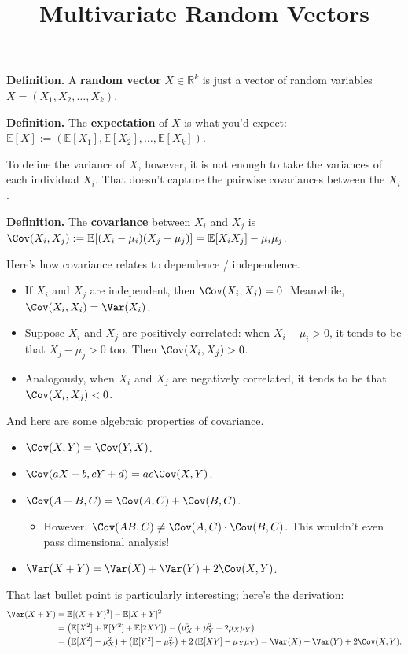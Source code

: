 \title{Multivariate Random Vectors}



\textbf{Definition.} A \textbf{random vector} $X \in \mathbb{R}^k$
is just a vector of random variables $X = (X_1, X_2, \dots, X_k)$.

\textbf{Definition.} The \textbf{expectation} of $X$ is what you'd expect:
$\mathbb{E}[X] := (\mathbb{E}[X_1], \mathbb{E}[X_2], \dots, \mathbb{E}[X_k])$.

To define the variance of $X$, however, it is not enough to take the
variances of each individual $X_i$.  That doesn't capture
the pairwise covariances between the $X_i$.

\textbf{Definition.} The \textbf{covariance} between $X_i$ and $X_j$
is $\Cov(X_i, X_j) := \mathbb{E}[(X_i - \mu_i)(X_j - \mu_j)]
= \mathbb{E}[X_iX_j] - \mu_i \mu_j$.

\begin{remark}
    Here's how covariance relates to dependence / independence.
    \begin{itemize}
        \item If $X_i$ and $X_j$ are independent, then $\Cov(X_i, X_j) = 0$.
        Meanwhile, $\Cov(X_i, X_i) = \Var(X_i)$.
        \item Suppose $X_i$ and $X_j$ are positively correlated:
        when $X_i - \mu_i > 0$, it tends to be that $X_j - \mu_j > 0$ too.
        Then $\Cov(X_i, X_j) > 0$.
        \item Analogously, when $X_i$ and $X_j$ are negatively correlated,
        it tends to be that $\Cov(X_i, X_j) < 0$.
    \end{itemize}
    And here are some algebraic properties of covariance.
    \begin{itemize}
        \item $\Cov(X, Y) = \Cov(Y, X)$.
        \item $\Cov(aX + b, cY + d) = ac \Cov(X, Y)$.
        \item $\Cov(A + B, C) = \Cov(A, C) + \Cov(B, C)$.
        \begin{itemize}
            \item However, $\Cov(AB, C) \neq \Cov(A, C) \cdot \Cov(B, C)$.
            This wouldn't even pass dimensional analysis!
        \end{itemize}
        \item $\Var(X + Y) = \Var(X) + \Var(Y) + 2\Cov(X, Y)$.
    \end{itemize}
    That last bullet point is particularly interesting; here's the derivation:
    \begin{align*}
        \Var(X + Y) & = \mathbb{E}[(X + Y)^2] - \mathbb{E}[X + Y]^2 \\
        & = \left(\mathbb{E}[X^2] + \mathbb{E}[Y^2] + \mathbb{E}[2XY]\right) -
            \left(\mu_X^2 + \mu_Y^2 + 2\mu_X\mu_Y\right) \\
        & = \left(\mathbb{E}[X^2] - \mu_X^2\right) + \left(\mathbb{E}[Y^2] - \mu_Y^2\right) +
            2 \left(\mathbb{E}[XY] - \mu_X\mu_Y\right) = \Var(X) + \Var(Y) + 2\Cov(X, Y).
    \end{align*}
\end{remark}

